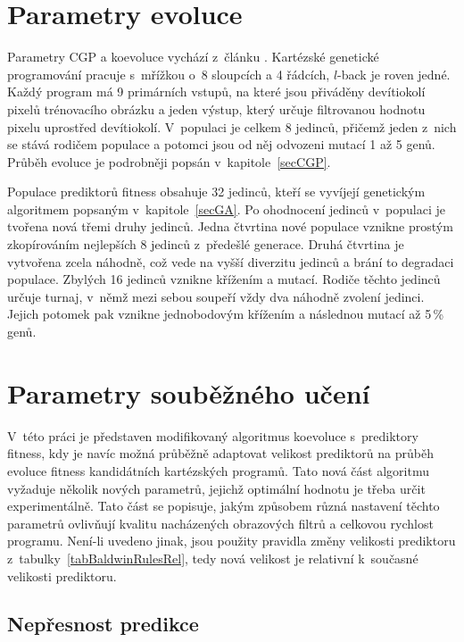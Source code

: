 \section{Parametry evoluce}
\label{secExpEvoParams}

Parametry CGP a koevoluce vychází z~článku \cite{SikuPPSN}. Kartézské genetické programování pracuje s~mřížkou o~8 sloupcích a 4 řádcích, $l$-back je roven jedné. Každý program má 9 primárních vstupů, na které jsou přiváděny devítiokolí pixelů trénovacího obrázku a jeden výstup, který určuje filtrovanou hodnotu pixelu uprostřed devítiokolí. V~populaci je celkem 8 jedinců, přičemž jeden z~nich se stává rodičem populace a potomci jsou od něj odvozeni mutací 1 až 5 genů. Průběh evoluce je podrobněji popsán v~kapitole~\ref{secCGP}.

Populace prediktorů fitness obsahuje 32 jedinců, kteří se vyvíjejí genetickým algoritmem popsaným v~kapitole~\ref{secGA}. Po ohodnocení jedinců v~populaci je tvořena nová třemi druhy jedinců. Jedna čtvrtina nové populace vznikne prostým zkopírováním nejlepších 8 jedinců z~předešlé generace. Druhá čtvrtina je vytvořena zcela náhodně, což vede na vyšší diverzitu jedinců a brání to degradaci populace. Zbylých 16 jedinců vznikne křížením a mutací. Rodiče těchto jedinců určuje turnaj, v~němž mezi sebou soupeří vždy dva náhodně zvolení jedinci. Jejich potomek pak vznikne jednobodovým křížením a následnou mutací až 5\,\% genů.

\section{Parametry souběžného učení}
\label{secExpColearnParams}

V~této práci je představen modifikovaný algoritmus koevoluce s~prediktory fitness, kdy je navíc možná průběžně adaptovat velikost prediktorů na průběh evoluce fitness kandidátních kartézských programů. Tato nová část algoritmu vyžaduje několik nových parametrů, jejichž optimální hodnotu je třeba určit experimentálně. Tato část se popisuje, jakým způsobem různá nastavení těchto parametrů ovlivňují kvalitu nacházených obrazových filtrů a celkovou rychlost programu. Není-li uvedeno jinak, jsou použity pravidla změny velikosti prediktoru z~tabulky~\ref{tabBaldwinRulesRel}, tedy nová velikost je relativní k~současné velikosti prediktoru.

\subsection{Nepřesnost predikce}

